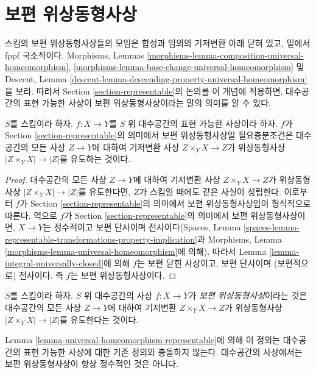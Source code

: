 \section{보편 위상동형사상}
\label{section-universal-homeomorphisms}

\noindent
스킴의 보편 위상동형사상들의 모임은 합성과 임의의 기저변환 아래
닫혀 있고, 밑에서 fppf 국소적이다. Morphisms, Lemmas
\ref{morphisms-lemma-composition-universal-homeomorphism},
\ref{morphisms-lemma-base-change-universal-homeomorphism} 및 Descent,
Lemma \ref{descent-lemma-descending-property-universal-homeomorphism}을
보라. 따라서 Section \ref{section-representable}의 논의를 이 개념에
적용하면, 대수공간의 표현 가능한 사상이 보편 위상동형사상이라는 말의
의미를 알 수 있다.

\begin{lemma}
\label{lemma-universal-homeomorphism-representable}
$S$를 스킴이라 하자. $f : X \to Y$를 $S$ 위 대수공간의 표현 가능한
사상이라 하자. $f$가 Section \ref{section-representable}의 의미에서
보편 위상동형사상일 필요충분조건은 대수공간의 모든 사상 $Z \to Y$에
대하여 기저변환 사상 $Z \times_Y X \to Z$가 위상동형사상
$|Z \times_Y X| \to |Z|$를 유도하는 것이다.
\end{lemma}

\begin{proof}
대수공간의 모든 사상 $Z \to Y$에 대하여 기저변환 사상
$Z \times_Y X \to Z$가 위상동형사상
$|Z \times_Y X| \to |Z|$를 유도한다면, $Z$가 스킴일 때에도 같은
사실이 성립한다. 이로부터 $f$가 Section \ref{section-representable}의
의미에서 보편 위상동형사상임이 형식적으로 따른다. 역으로 $f$가
Section \ref{section-representable}의 의미에서 보편 위상동형사상이면,
$X \to Y$는 정수적이고 보편 단사이며 전사이다(Spaces, Lemma
\ref{spaces-lemma-representable-transformations-property-implication}과
Morphisms, Lemma \ref{morphisms-lemma-universal-homeomorphism}에 의해).
따라서 Lemma \ref{lemma-integral-universally-closed}에 의해 $f$는 보편
닫힌 사상이고, 보편 단사이며 (보편적으로) 전사이다. 즉 $f$는 보편
위상동형사상이다.
\end{proof}

\begin{definition}
\label{definition-universal-homeomorphism}
$S$를 스킴이라 하자. $S$ 위 대수공간의 사상 $f : X \to Y$가
{\it 보편 위상동형사상}이라는 것은 대수공간의 모든 사상 $Z \to Y$에
대하여 기저변환 $Z \times_Y X \to Z$가 위상동형사상
$|Z \times_Y X| \to |Z|$를 유도한다는 것이다.
\end{definition}

\noindent
Lemma \ref{lemma-universal-homeomorphism-representable}에 의해 이 정의는
대수공간의 표현 가능한 사상에 대한 기존 정의와 충돌하지 않는다.
대수공간의 사상에서는 보편 위상동형사상이 항상 정수적인 것은 아니다.

